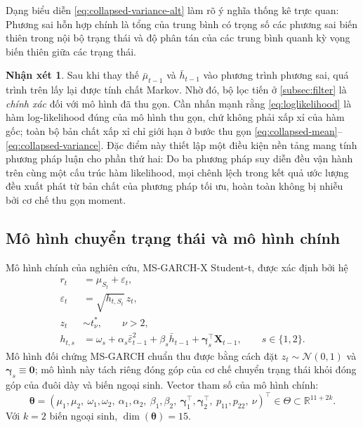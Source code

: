 \documentclass[12pt,a4paper]{article}
\numberwithin{equation}{section}
\theoremstyle{definition}
\newtheorem{remark}{Nhận xét}[section]
\newcommand{\R}{\mathbb{R}}
\newcommand{\Param}{\symbf{\theta}}
\newcommand{\Xvec}{\symbf{X}}
\newcommand{\bmgamma}{\symbf{\gamma}}
\begin{document}
Dạng biểu diễn \eqref{eq:collapsed-variance-alt} làm rõ ý nghĩa thống kê trực quan: Phương sai hỗn hợp chính là tổng của trung bình có trọng số các phương sai biến thiên trong nội bộ trạng thái và độ phân tán của các trung bình quanh kỳ vọng biến thiên giữa các trạng thái.

\begin{remark}
	Sau khi thay thế $\bar\mu_{t-1}$ và $\bar h_{t-1}$ vào phương trình phương sai, quá trình trên lấy lại được tính chất Markov. Nhờ đó, bộ lọc tiến ở \cref{subsec:filter} là \emph{chính xác} đối với mô hình đã thu gọn. Cần nhấn mạnh rằng \eqref{eq:loglikelihood} là hàm log-likelihood đúng của mô hình thu gọn, chứ không phải xấp xỉ của hàm gốc; toàn bộ bản chất xấp xỉ chỉ giới hạn ở bước thu gọn \eqref{eq:collapsed-mean}--\eqref{eq:collapsed-variance}. Đặc điểm này thiết lập một điều kiện nền tảng mang tính phương pháp luận cho phần thứ hai: Do ba phương pháp suy diễn đều vận hành trên cùng một cấu trúc hàm likelihood, mọi chênh lệch trong kết quả ước lượng đều xuất phát từ bản chất của phương pháp tối ưu, hoàn toàn không bị nhiễu bởi cơ chế thu gọn moment.
\end{remark}
	
	\subsection{Mô hình chuyển trạng thái và mô hình chính}\label{subsec:main-model}
	Mô hình chính của nghiên cứu, MS-GARCH-X Student-t, được xác định bởi hệ
	\begin{align}
		r_t &= \mu_{S_t}+\varepsilon_t,
		\label{eq:main-mean}\\
		\varepsilon_t &= \sqrt{h_{t,S_t}}\,z_t,
		\label{eq:main-error}\\
		z_t &\sim t^{*}_{\nu},\qquad \nu>2,
		\label{eq:main-dist}\\
		h_{t,s} &= \omega_s+\alpha_s\bar\varepsilon_{t-1}^{2}
		+\beta_s\bar h_{t-1}+\bmgamma_s^{\top}\Xvec_{t-1},
		\qquad s\in\{1,2\}.
		\label{eq:main-variance}
	\end{align}
	Mô hình đối chứng MS-GARCH chuẩn thu được bằng cách đặt $z_t\sim\mathcal{N}(0,1)$ và
	$\bmgamma_s\equiv\symbf 0$; mô hình này tách riêng đóng góp của cơ chế chuyển trạng thái
	khỏi đóng góp của đuôi dày và biến ngoại sinh. Vector tham số của mô hình chính:
	\begin{equation}
		\Param=\left(\mu_1,\mu_2,\ \omega_1,\omega_2,\ \alpha_1,\alpha_2,\ \beta_1,\beta_2,\
		\bmgamma_1^{\top},\bmgamma_2^{\top},\ p_{11},p_{22},\ \nu\right)^{\top}
		\in\Theta\subset\R^{11+2k}.
		\label{eq:parameter-vector}
	\end{equation}
	Với $k=2$ biến ngoại sinh, $\dim(\Param)=15$.
	
\end{document}

